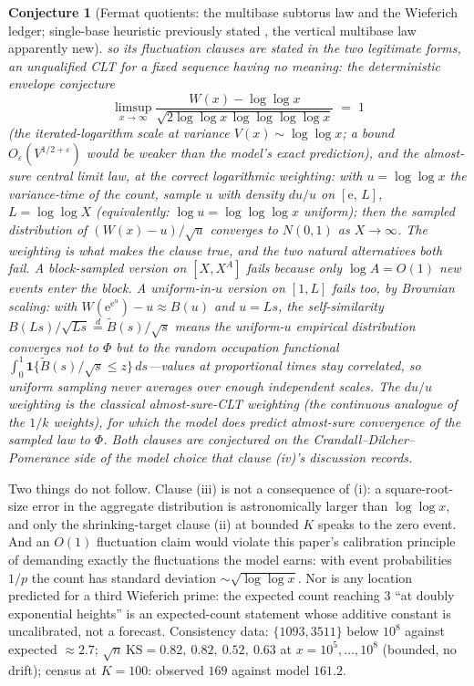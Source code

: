 \documentclass[11pt]{article}
\newtheorem{conjecture}{Conjecture}
\theoremstyle{definition}
\newcommand{\e}{\mathrm{e}}
\begin{document}
\begin{conjecture}[Fermat quotients: the multibase subtorus law and
the Wieferich ledger; single-base heuristic previously stated
\cite{CDP}, the vertical multibase law apparently new]
so its fluctuation clauses are stated in the two legitimate forms,
an unqualified CLT for a fixed sequence having no meaning: the
\emph{deterministic envelope conjecture}
\[
\limsup_{x\to\infty}
\frac{W(x)-\log\log x}
{\sqrt{2\log\log x\,\log\log\log\log x}}\;=\;1
\]
(the iterated-logarithm scale at variance $V(x)\sim\log\log x$; a
bound $O_\varepsilon(V^{1/2+\varepsilon})$ would be weaker than
the model's exact prediction), and the \emph{almost-sure central
limit law, at the correct logarithmic weighting}: with
$u=\log\log x$ the variance-time of the count, sample $u$ with
density $du/u$ on $[\e,\,L]$, $L=\log\log X$ (equivalently: $\log u
=\log\log\log x$ uniform); then the sampled distribution of
$(W(x)-u)/\sqrt u$ converges to $N(0,1)$ as $X\to\infty$.  The
weighting is what makes the clause true, and the two natural
alternatives both fail.  A block-sampled version on $[X,X^A]$
fails because only $\log A=O(1)$ new events enter the block.  A
\emph{uniform}-in-$u$ version on $[1,L]$ fails too, by Brownian
scaling: with
$W(\e^{\e^u})-u\approx B(u)$ and $u=Ls$, the self-similarity
$B(Ls)/\sqrt{Ls}\overset{d}=\widetilde B(s)/\sqrt s$ means the
uniform-$u$ empirical distribution converges not to $\Phi$ but to
the \emph{random} occupation functional
$\int_0^1\mathbf 1\{\widetilde B(s)/\sqrt s\le z\}\,ds$---values at
proportional times stay correlated, so uniform sampling never
averages over enough independent scales.  The $du/u$ weighting is
the classical almost-sure-CLT weighting (the continuous analogue of
the $1/k$ weights), for which the model does predict almost-sure
convergence of the sampled law to $\Phi$.  Both clauses are
conjectured on the
Crandall--Dilcher--Pomerance side of the model choice that clause
(iv)'s discussion records.
\end{conjecture}

Two things do not follow.  Clause (iii) is not a
consequence of (i): a square-root-size error in the aggregate
distribution is astronomically larger than $\log\log x$, and only the
shrinking-target clause (ii) at bounded $K$ speaks to the zero event.
And an $O(1)$ fluctuation claim would violate this paper's calibration
principle of demanding exactly the fluctuations the model earns: with
event probabilities $1/p$ the count has standard deviation
$\sim\sqrt{\log\log x}$.  Nor is any
location predicted for a third Wieferich prime: the expected count
reaching $3$ ``at doubly exponential heights'' is an expected-count
statement whose additive constant is uncalibrated, not a forecast.
Consistency data: $\{1093,3511\}$ below $10^8$ against
expected $\approx2.7$; $\sqrt n\,\mathrm{KS}=0.82,\ 0.82,\ 0.52,\
0.63$ at $x=10^5,\dots,10^8$ (bounded, no drift); census at $K=100$:
observed $169$ against model $161.2$.
\end{document}
